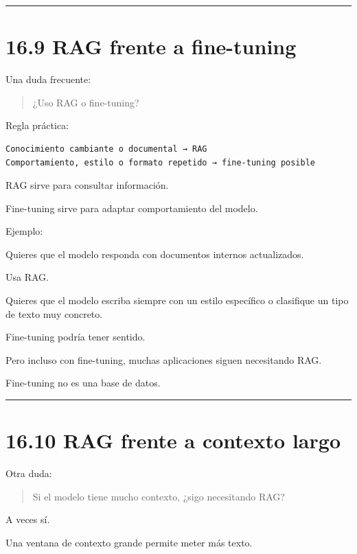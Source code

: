 \begin{center}\rule{0.5\linewidth}{0.5pt}\end{center}

\section{16.9 RAG frente a fine-tuning}\label{rag-frente-a-fine-tuning}

Una duda frecuente:

\begin{quote}
¿Uso RAG o fine-tuning?
\end{quote}

Regla práctica:

\begin{lstlisting}
Conocimiento cambiante o documental → RAG
Comportamiento, estilo o formato repetido → fine-tuning posible
\end{lstlisting}

RAG sirve para consultar información.

Fine-tuning sirve para adaptar comportamiento del modelo.

Ejemplo:

Quieres que el modelo responda con documentos internos actualizados.

Usa RAG.

Quieres que el modelo escriba siempre con un estilo específico o
clasifique un tipo de texto muy concreto.

Fine-tuning podría tener sentido.

Pero incluso con fine-tuning, muchas aplicaciones siguen necesitando
RAG.

Fine-tuning no es una base de datos.

\begin{center}\rule{0.5\linewidth}{0.5pt}\end{center}

\section{16.10 RAG frente a contexto
largo}\label{rag-frente-a-contexto-largo}

Otra duda:

\begin{quote}
Si el modelo tiene mucho contexto, ¿sigo necesitando RAG?
\end{quote}

A veces sí.

Una ventana de contexto grande permite meter más texto.

